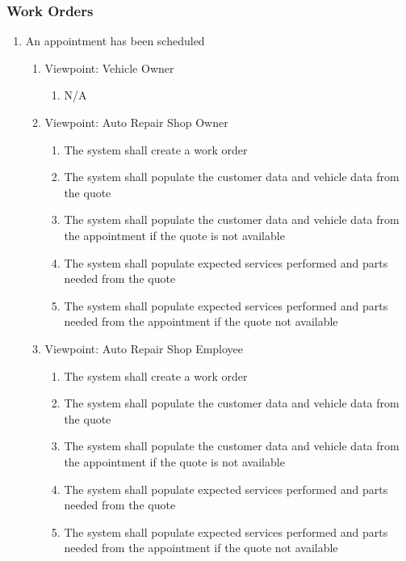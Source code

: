 \documentclass[12pt]{article}
\begin{document}
\subsubsection{Work Orders}
\begin{enumerate}[resume*=business_events]
	\item An appointment has been scheduled
	      \begin{enumerate}[VP\arabic*.]
		      \item Viewpoint: Vehicle Owner
		            \begin{enumerate}
			            \item[] N/A
		            \end{enumerate}
		      \item Viewpoint: Auto Repair Shop Owner
		            \begin{enumerate}
			            \item The system shall create a work order
			            \item The system shall populate the customer data and vehicle data from the quote
			            \item The system shall populate the customer data and vehicle data from the appointment if the quote is
			                  not available
			            \item The system shall populate expected services performed and parts needed from the quote
			            \item The system shall populate expected services performed and parts needed from the appointment if the
			                  quote not available
		            \end{enumerate}
		      \item Viewpoint: Auto Repair Shop Employee
		            \begin{enumerate}
			            \item The system shall create a work order
			            \item The system shall populate the customer data and vehicle data from the quote
			            \item The system shall populate the customer data and vehicle data from the appointment if the quote is
			                  not available
			            \item The system shall populate expected services performed and parts needed from the quote
			            \item The system shall populate expected services performed and parts needed from the appointment if the
			                  quote not available
		            \end{enumerate}
	      \end{enumerate}


\end{enumerate}
\end{document}
